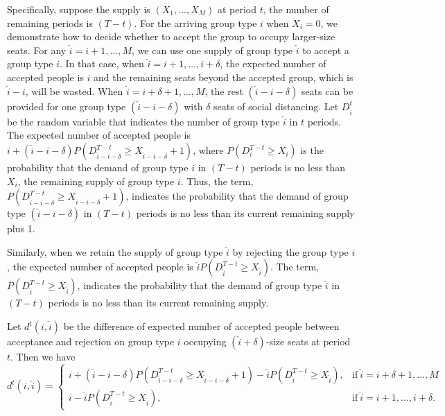Specifically, suppose the supply is $(X_1, \ldots, X_M)$ at period $t$, the number of remaining periods is $(T-t)$. For the arriving group type $i$ when $X_i = 0$, we demonstrate how to decide whether to accept the group to occupy larger-size seats. For any $\hat{i}=i+1, \ldots, M$, we can use one supply of group type $\hat{i}$ to accept a group type $i$. In that case, when $\hat{i} = i+1, \ldots, i+\delta$, the expected number of accepted people is $i$ and the remaining seats beyond the accepted group, which is $\hat{i}-i$, will be wasted. When $\hat{i} = i+\delta+1, \ldots, M$, the rest $(\hat{i}-i-\delta)$ seats can be provided for one group type $(\hat{i}-i-\delta)$ with $\delta$ seats of social distancing. Let $D_{\hat{i}}^{t}$ be the random variable that indicates the number of group type $\hat{i}$ in $t$ periods. The expected number of accepted people is $i + (\hat{i}-i-\delta)P(D_{\hat{i}-i-\delta}^{T-t} \geq X_{\hat{i}-i-\delta}+1)$, where $P(D_i^{T-t} \geq X_i)$ is the probability that the demand of group type $i$ in $(T-t)$ periods is no less than $X_i$, the remaining supply of group type $i$. Thus, the term, $P(D_{\hat{i}-i-\delta}^{T-t} \geq X_{\hat{i}-i-\delta}+1)$, indicates the probability that the demand of group type $(\hat{i}-i-\delta)$ in $(T-t)$ periods is no less than its current remaining supply plus 1. 

Similarly, when we retain the supply of group type $\hat{i}$ by rejecting the group type $i$, the expected number of accepted people is $\hat{i} P(D_{\hat{i}}^{T-t} \geq X_{\hat{i}})$. The term, $P(D_{\hat{i}}^{T-t} \geq X_{\hat{i}})$, indicates the probability that the demand of group type $\hat{i}$ in $(T-t)$ periods is no less than its current remaining supply.

Let $d^{t}(i,\hat{i})$ be the difference of expected number of accepted people between acceptance and rejection on group type $i$ occupying $(\hat{i}+\delta)$-size seats at period $t$. Then we have
\begin{equation*}
	d^{t}(i,\hat{i}) = \begin{cases}
    i + (\hat{i}-i-\delta)P(D_{\hat{i}-i-\delta}^{T-t} \geq X_{\hat{i}-i-\delta}+1) - \hat{i} P(D_{\hat{i}}^{T-t} \geq X_{\hat{i}}), &\text{if}~ \hat{i} = i+\delta+1, \ldots, M \\
    i - \hat{i} P(D_{\hat{i}}^{T-t} \geq X_{\hat{i}}), &\text{if}~ \hat{i} = i+1, \ldots, i+\delta.
		\end{cases}
\end{equation*}


